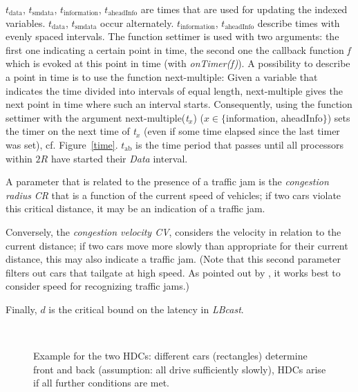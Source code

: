 \documentclass{acmrip}
\begin{document}
$t_{\mathrm{data}}$, $t_{\mathrm{smdata}}$,
$t_{\mathrm{information}}$, $t_{\mathrm{aheadInfo}}$ are times that
are used for updating the indexed variables. $t_{\mathrm{data}}$,
$t_{\mathrm{smdata}}$ occur alternately. $t_{\mathrm{information}}$,
$t_{\mathrm{aheadInfo}}$ describe times with evenly spaced
intervals. The function settimer is used with two arguments: the
first one indicating a certain point in time, the second one the
callback function {\it f} which is evoked at this point in time
(with {\it onTimer(f)}). A possibility to describe a point in time
is to use the function next-multiple: Given a variable that
indicates the time divided into intervals of equal length,
next-multiple gives the next point in time where such an interval
starts. Consequently, using the function settimer with the argument
next-multiple(\textit{t}$_x$) ($x \in \{$information, aheadInfo$\}$)
sets the timer on the next time of \textit{t}$_x$ (even if some time
elapsed since the last timer was set), cf. Figure~\ref{time}.
$t_{\mathrm{ab}}$ is the time period that passes until all
processors within $2R$ have started their {\em Data} interval.

A parameter that is related to the presence of a traffic jam is the
{\em congestion radius} {\em CR} that is a function of the current speed
of vehicles; if two cars violate this critical distance, it may be
an indication of a traffic jam.

Conversely, the {\em congestion velocity CV}, considers the velocity
in relation to the current distance; if two cars move more slowly than
appropriate for their current distance, this may also indicate a
traffic jam. (Note that this second parameter filters out cars that
tailgate at high speed. As pointed out by \cite{brilon05}, it works
best to consider speed for recognizing traffic jams.)

Finally, $d$ is the critical bound on the latency in {\em LBcast}.


\begin{figure}[tp]
\centering
{}\\
\caption{\label{cars}\small Example for the two HDCs: different cars
(rectangles) determine front and back (assumption: all drive sufficiently
slowly), HDCs arise if all further conditions are met. }
\end{figure}
\end{document}

